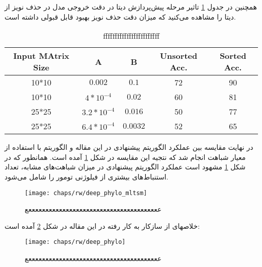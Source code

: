 همچنین در جدول \ref{tab:table_55} تاثیر مرحله پیش‌پردازش دیتا در دقت خروجی مدل در حذف نویز از دیتا را مشاهده می‌کنید که میزان دقت حذف نویز بهبود قابل قبولی داشته است. 

\begin{latin}
\begin{table}[!ht]
	\centering
	\begin{tabular}{|c|c|c|c|c|}
		\hline
		\rowcolor[gray]{0.9}
		Input MAtrix Size & A            & B        & Unsorted Acc. & Sorted Acc.  	 \\\hline
		10*10               & $0.002$       & $0.1$    & 72            & 90          \\\hline
		10*10               & $4*10^{-4}$   & $0.02$   & 60            & 81          \\\hline
		25*25               & $3.2*10^{-4}$ & $0.016$  & 50            & 77          \\\hline
		25*25               & $6.4*10^{-4}$ & $0.0032$ & 52            & 65         \\\hline
	\end{tabular}\par
\caption{ffffffffffffffffffffffff}
\label{tab:table_55}
\end{table}
\end{latin}



در نهایت مقایسه بین عملکرد الگوریتم پیشنهادی در این مقاله و الگوریتم  با استفاده از معیار شباهت  انجام شد که نتجیه این مقایسه در شکل \ref{fig:ch_rw:deep_phylo_mltsm} آمده است. همانطور که در شکل \ref{fig:ch_rw:deep_phylo_mltsm} مشهود است عملکرد الگوریتم پیشنهادی در میزان شباهت‌های مشابه، تعداد استنباط‌های بیشتری از فیلوژنی تومور را شامل می‌شود. 


\begin{figure}[!ht]
	\centerline{\texttt{[image: chaps/rw/deep\_phylo\_mltsm]}}
	\caption{عععععععععععععععععععععععععععععععععععععععع}
	\label{fig:ch_rw:deep_phylo_mltsm}
\end{figure}


خلاصهای از سازکار به کار رفته در این مقاله در شکل \ref{fig:ch_rw:deep_phylo} آمده است: 

\begin{figure}[!ht]
	\centerline{\texttt{[image: chaps/rw/deep\_phylo]}}
	\caption{عععععععععععععععععععععععععععععععععععععععع}
	\label{fig:ch_rw:deep_phylo}
\end{figure}





